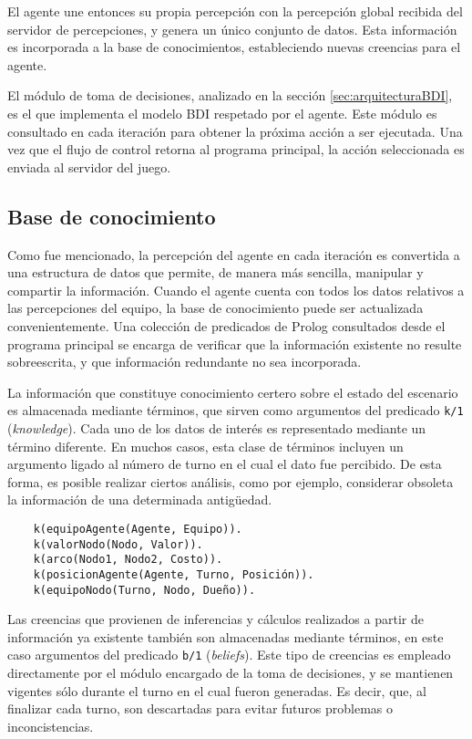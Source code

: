 \documentclass[oneside]{book}
\begin{document}
El agente une entonces su propia percepción con la percepción global recibida del servidor 
de percepciones, y genera un único conjunto de datos. Esta información es incorporada a la 
base de conocimientos, estableciendo nuevas creencias para el agente.

El módulo de toma de decisiones, analizado en la sección \ref{sec:arquitecturaBDI}, es el 
que implementa el modelo BDI respetado por el agente. Este módulo es consultado en cada 
iteración para obtener la próxima acción a ser ejecutada. Una vez que el flujo de control 
retorna al programa principal, la acción seleccionada es enviada al servidor del juego.

\subsection{Base de conocimiento}


Como fue mencionado, la percepción del agente en cada iteración es convertida a una 
estructura de datos que permite, de manera más sencilla, manipular y compartir la 
información. Cuando el agente cuenta con todos los datos relativos a las percepciones 
del equipo, la base de conocimiento puede ser actualizada convenientemente. Una colección 
de predicados de Prolog consultados desde el programa principal se encarga de verificar 
que la información existente no resulte sobreescrita, y que información redundante no sea 
incorporada. 

La información que constituye conocimiento certero sobre el estado del escenario es 
almacenada mediante términos, que sirven como argumentos del predicado \texttt{k/1} 
(\textit{knowledge}). Cada uno de los datos de interés es representado mediante un 
término diferente. 
En muchos casos, esta clase de términos incluyen un argumento ligado al número de turno 
en el cual el dato fue percibido. De esta forma, es posible realizar ciertos análisis, 
como por ejemplo, considerar obsoleta la información de una determinada antigüedad.

\begin{verbatim}    
    k(equipoAgente(Agente, Equipo)).
    k(valorNodo(Nodo, Valor)).
    k(arco(Nodo1, Nodo2, Costo)).
    k(posicionAgente(Agente, Turno, Posición)).
    k(equipoNodo(Turno, Nodo, Dueño)).    
\end{verbatim}

Las creencias que provienen de inferencias y cálculos realizados a partir de información 
ya existente también son almacenadas mediante términos, en este caso argumentos del 
predicado \texttt{b/1} (\textit{beliefs}). Este tipo de creencias es empleado directamente 
por el módulo encargado de la toma de decisiones, y se mantienen vigentes sólo durante el 
turno en el cual fueron generadas. Es decir, que, al finalizar cada turno, son descartadas 
para evitar futuros problemas o inconcistencias.
\end{document}
